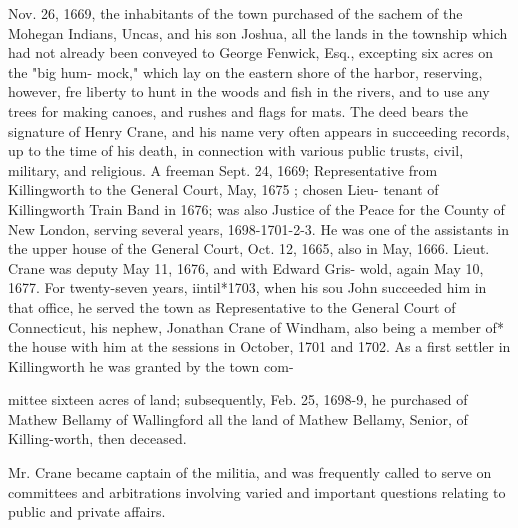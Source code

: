 \documentclass{book}
\begin{document}
Nov. 26, 1669, the inhabitants of the town purchased of the 
sachem of the Mohegan Indians, Uncas, and his son Joshua, all 
the lands in the township which had not already been conveyed to 
George Fenwick, Esq., excepting six acres on the "big hum- 
mock," which lay on the eastern shore of the harbor, reserving, 
however, fre liberty to hunt in the woods and fish in the rivers, 
and to use any trees for making canoes, and rushes and flags for 
mats. The deed bears the signature of Henry Crane, and his 
name very often appears in succeeding records, up to the time of 
his death, in connection with various public trusts, civil, military, 
and religious. A freeman Sept. 24, 1669; Representative from 
Killingworth to the General Court, May, 1675 ; chosen Lieu- 
tenant of Killingworth Train Band in 1676; was also Justice of 
the Peace for the County of New London, serving several years, 
1698-1701-2-3. He was one of the assistants in the upper 
house of the General Court, Oct. 12, 1665, also in May, 1666. 
Lieut. Crane was deputy May 11, 1676, and with Edward Gris- 
wold, again May 10, 1677. For twenty-seven years, iintil*1703, 
when his sou John succeeded him in that office, he served the 
town as Representative to the General Court of Connecticut, his 
nephew, Jonathan Crane of Windham, also being a member of* 
the house with him at the sessions in October, 1701 and 1702. 
As a first settler in Killingworth he was granted by the town com- 




mittee sixteen acres of land; subsequently, Feb. 25, 1698-9, he 
purchased of Mathew Bellamy of Wallingford all the land of 
Mathew Bellamy, Senior, of Killing-worth, then deceased. 

Mr. Crane became captain of the militia, and was frequently 
called to serve on committees and arbitrations involving varied 
and important questions relating to public and private affairs. 
\end{document}
